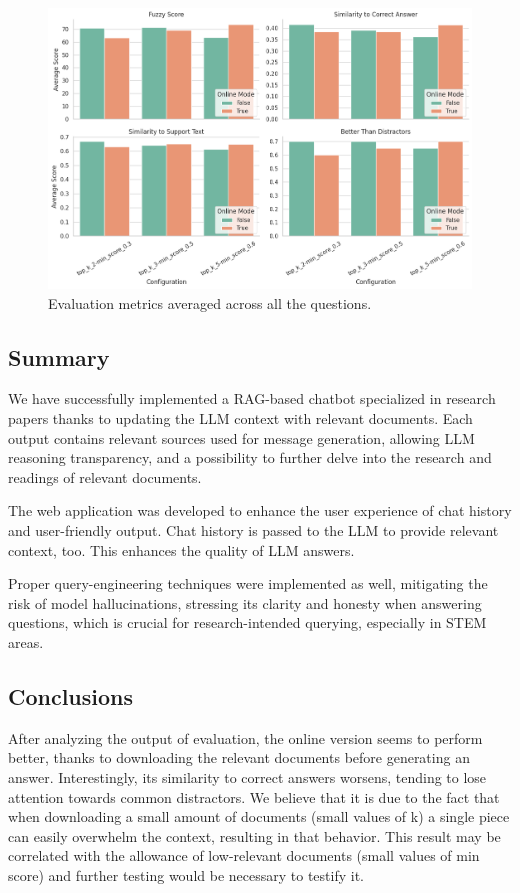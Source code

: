 \documentclass[fleqn,moreauthors,10pt]{ds_report}
\begin{document}
\begin{figure}[ht]\centering 
	\includegraphics[width=1\linewidth]{images/results_plot.png}
	\caption{Evaluation metrics averaged across all the questions.}
	\label{fig:results_plot}
\end{figure}

\subsection*{Summary}

We have successfully implemented a RAG-based chatbot specialized in research papers thanks to updating the LLM context with relevant documents. Each output contains relevant sources used for message generation, allowing LLM reasoning transparency, and a possibility to further delve into the research and readings of relevant documents.

The web application was developed to enhance the user experience of chat history and user-friendly output.
Chat history is passed to the LLM to provide relevant context, too. This enhances the quality of LLM answers.

Proper query-engineering techniques were implemented as well, mitigating the risk of model hallucinations, stressing its clarity and honesty when answering questions, which is crucial for research-intended querying, especially in STEM areas.

\subsection*{Conclusions}

After analyzing the output of evaluation, the online version seems to perform better, thanks to downloading the relevant documents before generating an answer. Interestingly, its similarity to correct answers worsens, tending to lose attention towards common distractors. We believe that it is due to the fact that when downloading a small amount of documents (small values of k) a single piece can easily overwhelm the context, resulting in that behavior. This result may be correlated with the allowance of low-relevant documents (small values of min score) and further testing would be necessary to testify it.


\



\end{document}
